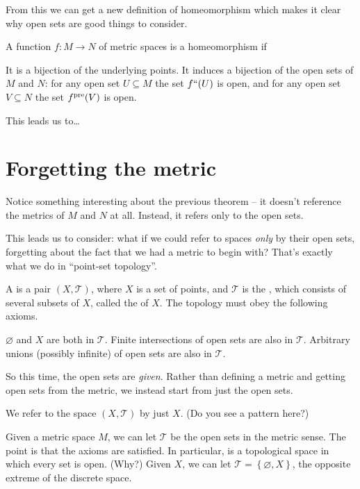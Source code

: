 From this we can get a new definition of homeomorphism
which makes it clear why open sets are good things to consider.
\begin{theorem}
	A function $f : M \to N$ of metric spaces is a homeomorphism if 
	\begin{enumerate}[(i)]
		\ii It is a bijection of the underlying points.
		\ii It induces a bijection of the open sets of $M$ and $N$:
		for any open set $U \subseteq M$ the set $f``(U)$ is open,
		and for any open set $V \subseteq N$ the set $f^{\text{pre}}(V)$ is open.
	\end{enumerate}
\end{theorem}

This leads us to\dots

\section{Forgetting the metric}
Notice something interesting about the previous theorem --
it doesn't reference the metrics of $M$ and $N$ at all.
Instead, it refers only to the open sets.

This leads us to consider:
what if we could refer to spaces \emph{only} by their open sets,
forgetting about the fact that we had a metric to begin with?
That's exactly what we do in ``point-set topology''.

\begin{definition}
	A  is a pair $(X, \mathcal T)$,
	where $X$ is a set of points,
	and $\mathcal T$ is the , which consists of several subsets of $X$, called the  of $X$.
	The topology must obey the following axioms.
	\begin{itemize}
		\ii $\varnothing$ and $X$ are both in $\mathcal T$.
		\ii Finite intersections of open sets are also in $\mathcal T$.
		\ii Arbitrary unions (possibly infinite) of open sets are also in $\mathcal T$.
	\end{itemize}
\end{definition}
So this time, the open sets are \emph{given}.
Rather than defining a metric and getting open sets from the metric,
we instead start from just the open sets.
\begin{abuse}
	We refer to the space $(X, \mathcal T)$ by just $X$.
	(Do you see a pattern here?)
\end{abuse}

\begin{example}
	\listhack
	\begin{enumerate}[(a)]
		\ii Given a metric space $M$, we can let $\mathcal T$ be
		the open sets in the metric sense.
		The point is that the axioms are satisfied.
		\ii In particular,  is a topological space in which every set is open. (Why?)
		\ii Given $X$, we can let $\mathcal T = \left\{ \varnothing, X \right\}$,
		the opposite extreme of the discrete space.
	\end{enumerate}
\end{example}

